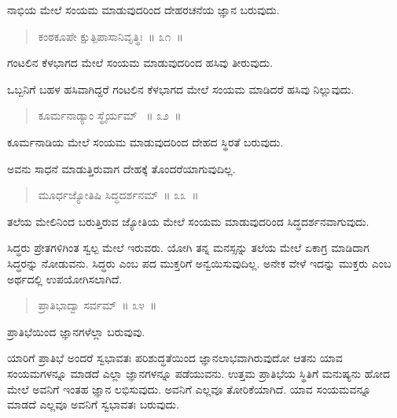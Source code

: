 \vspace{-0.3cm}

ನಾಭಿಯ ಮೇಲೆ ಸಂಯಮ ಮಾಡುವುದರಿಂದ ದೇಹರಚನೆಯ ಜ್ಞಾನ ಬರುವುದು. 

\vspace{-0.3cm}

\begin{verse}
ಕಂಠಕೂಪೇ ಕ್ಷುತ್ಪಿಪಾಸಾನಿವೃತ್ಥಿಃ~॥ ೩೧~॥
\end{verse}

\vspace{-0.3cm}

ಗಂಟಲಿನ ಕೆಳಭಾಗದ ಮೇಲೆ ಸಂಯಮ ಮಾಡುವುದರಿಂದ ಹಸಿವು ತೀರುವುದು. 

ಒಬ್ಬನಿಗೆ ಬಹಳ ಹಸಿವಾಗಿದ್ದರೆ ಗಂಟಲಿನ ಕೆಳಭಾಗದ ಮೇಲೆ ಸಂಯಮ ಮಾಡಿದರೆ ಹಸಿವು ನಿಲ್ಲುವುದು. 

\vspace{-0.3cm}

\begin{verse}
ಕೂರ್ಮನಾಡ್ಯಾಂ ಸ್ಥೈರ್ಯಮ್ ~॥ ೩೨~॥
\end{verse}

\vspace{-0.3cm}

ಕೂರ್ಮನಾಡಿಯ ಮೇಲೆ ಸಂಯಮ ಮಾಡುವುದರಿಂದ ದೇಹದ ಸ್ಥಿರತೆ ಬರುವುದು. 

ಅವನು ಸಾಧನೆ ಮಾಡುತ್ತಿರುವಾಗ ದೇಹಕ್ಕೆ ತೊಂದರೆಯಾಗುವುದಿಲ್ಲ. 

\vspace{-0.3cm}

\begin{verse}
ಮೂರ್ಧಜ್ಯೋತಿಷಿ ಸಿದ್ಧದರ್ಶನಮ್​~॥ ೩೩~॥
\end{verse}

\vspace{-0.3cm}

ತಲೆಯ ಮೇಲಿನಿಂದ ಬರುತ್ತಿರುವ ಜ್ಯೋತಿಯ ಮೇಲೆ ಸಂಯಮ ಮಾಡುವುದರಿಂದ ಸಿದ್ಧದರ್ಶನವಾಗುವುದು. 

ಸಿದ್ಧರು ಪ್ರೇತಗಳಿಗಿಂತ ಸ್ವಲ್ಪ ಮೇಲೆ ಇರುವರು. ಯೋಗಿ ತನ್ನ ಮನಸ್ಸನ್ನು ತಲೆಯ ಮೇಲೆ ಏಕಾಗ್ರ ಮಾಡಿದಾಗ ಸಿದ್ಧರನ್ನು ನೋಡುವನು. ಸಿದ್ಧರು ಎಂಬ ಪದ ಮುಕ್ತರಿಗೆ ಅನ್ವಯಿಸುವುದಿಲ್ಲ. ಅನೇಕ ವೇಳೆ ಇದನ್ನು ಮುಕ್ತರು ಎಂಬ ಅರ್ಥದಲ್ಲಿ ಉಪಯೋಗಿಸಲಾಗಿದೆ. 

\vspace{-0.3cm}

\begin{verse}
ಪ್ರಾತಿಭಾದ್ವಾ ಸರ್ವಮ್​~॥ ೩೪~॥
\end{verse}

\vspace{-0.3cm}

ಪ್ರಾತಿಭೆಯಿಂದ ಜ್ಞಾನಗಳೆಲ್ಲಾ ಬರುವುವು. 

ಯಾರಿಗೆ ಪ್ರಾತಿಭೆ ಅಂದರೆ ಸ್ವಭಾವತಃ ಪರಿಶುದ್ಧತೆಯಿಂದ ಜ್ಞಾನಲಾಭವಾಗಿರುವುದೋ ಆತನು ಯಾವ ಸಂಯಮಗಳನ್ನೂ ಮಾಡದೆ ಎಲ್ಲಾ ಜ್ಞಾನಗಳನ್ನೂ ಪಡೆಯುವನು. ಉತ್ತಮ ಪ್ರಾತಿಭೆಯ ಸ್ಥಿತಿಗೆ ಮನುಷ್ಯನು ಹೋದ ಮೇಲೆ ಅವನಿಗೆ ಇಂತಹ ಜ್ಞಾನ ಲಭಿಸುವುದು. ಅವನಿಗೆ ಎಲ್ಲವೂ ತೋರಿಕೆಯಾಗಿದೆ. ಯಾವ ಸಂಯಮವನ್ನೂ ಮಾಡದೆ ಎಲ್ಲವೂ ಅವನಿಗೆ ಸ್ವಭಾವತಃ ಬರುವುದು. 

